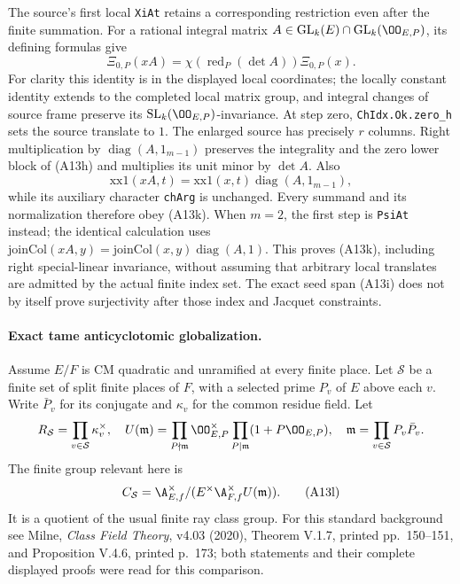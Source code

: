 \documentclass[11pt]{article}
\theoremstyle{definition}\newtheorem{definition}[theorem]{Definition}\newtheorem{remark}[theorem]{Remark}
\begin{document}
The source's first local \texttt{XiAt} retains a corresponding
restriction even after the finite summation.  For a rational integral matrix
$A\in\mathrm{GL}_k(E)\cap\mathrm{GL}_k(\OO_{E,P})$, its defining formulas give
\[
       \Xi_{0,P}(xA)=\chi(\operatorname{red}_P(\det A))\Xi_{0,P}(x).
       \tag{A13k}
\]
For clarity this identity is in the displayed local coordinates;
the locally constant identity extends to the completed local
matrix group, and integral changes of source frame preserve its
$\mathrm{SL}_k(\OO_{E,P})$-invariance.
At step zero, \texttt{ChIdx.Ok.zero\_h} sets the source
translate to $1$.  The enlarged source has precisely $r$
columns.  Right multiplication by
$\operatorname{diag}(A,1_{m-1})$ preserves the integrality
and the zero lower block of (A13h) and multiplies its unit
minor by $\det A$.  Also
\[
 \mathrm{xx1}(xA,t)=\mathrm{xx1}(x,t)
                    \operatorname{diag}(A,1_{m-1}),
\]
while its auxiliary character \texttt{chArg} is unchanged.
Every summand and its normalization therefore obey (A13k).
When $m=2$, the first step is \texttt{PsiAt} instead;
the identical calculation uses
$\mathrm{joinCol}(xA,y)=\mathrm{joinCol}(x,y)
\operatorname{diag}(A,1)$.
This proves (A13k), including right special-linear invariance,
without assuming that arbitrary local translates are admitted
by the actual finite index set.  The exact seed span (A13i)
does not by itself prove surjectivity after those index and
Jacquet constraints.

\paragraph{Exact tame anticyclotomic globalization.}
Assume $E/F$ is CM quadratic and unramified at every finite
place.  Let $\mathcal S$ be a finite set of split finite
places of $F$, with a selected prime $P_v$ of $E$ above each
$v$.  Write $\bar P_v$ for its conjugate and $\kappa_v$
for the common residue field.  Let
\[
 R_{\mathcal S}=\prod_{v\in\mathcal S}\kappa_v^\times,
 \quad
 U(\mathfrak m)=
 \prod_{P\nmid\mathfrak m}\OO_{E,P}^\times
 \prod_{P\mid\mathfrak m}(1+P\OO_{E,P}),
 \quad
 \mathfrak m=\prod_{v\in\mathcal S}P_v\bar P_v.
\]
The finite group relevant here is
\[
 C_{\mathcal S}=
 \A_{E,f}^\times/(E^\times\A_{F,f}^\times U(\mathfrak m)).
 \tag{A13l}
\]
It is a quotient of the usual finite ray class group.
For this standard background see Milne,
\emph{Class Field Theory}, v4.03 (2020), Theorem V.1.7,
printed pp.~150--151, and Proposition V.4.6,
printed p.~173; both statements and their complete displayed
proofs were read for this comparison.
\end{document}
